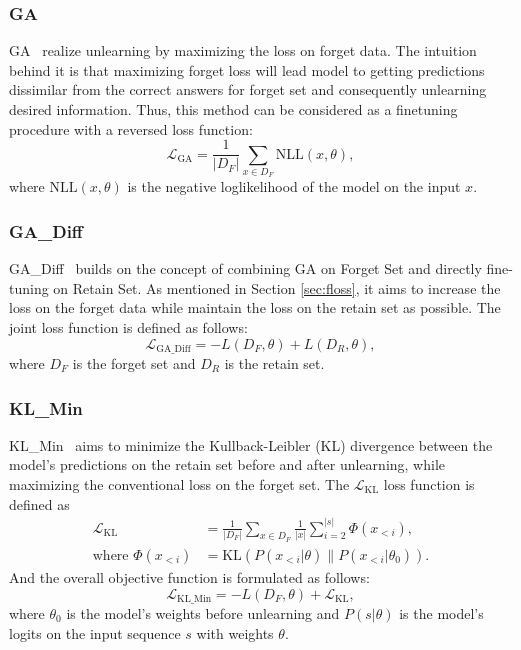 \subsubsection{GA}
GA~\cite{thudi2022GA} realize unlearning by maximizing the loss on forget data. The intuition behind it is that maximizing forget loss will lead model to getting predictions dissimilar from the correct answers for forget set and consequently unlearning desired information. Thus, this method can be considered as a finetuning procedure with a reversed loss function:
\begin{equation}
    \mathcal{L}_\text{GA} = \frac{1}{|D_F|} \sum_{x \in D_F} \text{NLL}(x, \theta),
\end{equation}
where $\text{NLL}(x, \theta)$ is the negative loglikelihood of the model on the input $x$.

\subsubsection{GA\_Diff}
GA\_Diff~\cite{liu2022GA_Diff} builds on the concept of combining GA on Forget Set and directly fine-tuning on Retain Set. As mentioned in Section \ref{sec:floss}, it aims to increase the loss on the forget data while maintain the loss on the retain set as possible. The joint loss function is defined as follows:
\begin{equation}
    \mathcal{L}_\text{GA\_Diff} = -L(D_F, \theta) + L(D_R, \theta),
\end{equation}
where $D_F$ is the forget set and $D_R$ is the retain set.

\subsubsection{KL\_Min}
KL\_Min~\cite{nguyen2020KL_Min} aims to minimize the Kullback-Leibler (KL) divergence between the model’s predictions on the retain set before and after unlearning, while maximizing the conventional loss on the forget set. The $\mathcal{L}_\text{KL}$ loss function is defined as
\begin{equation}
\begin{split}
\mathcal{L}_\text{KL}&=\frac{1}{|D_F|} \sum_{x \in D_F} \frac{1}{|x|} \sum_{i=2}^{|s|} \Phi(x_{<i}),\\
\text{where } \Phi(x_{<i})&=\text{KL} \left( P(x_{<i} | \theta) \Big\| P(x_{<i} | \theta_0) \right).
\end{split}
\end{equation}
And the overall objective function is formulated as follows:
\begin{equation}
    \mathcal{L}_\text{KL\_Min} = -L(D_F, \theta) + \mathcal{L}_\text{KL},
\end{equation}
where $\theta_0$ is the model’s weights before unlearning and $P(s | \theta)$ is the model’s logits on the input sequence $s$ with weights $\theta$.

